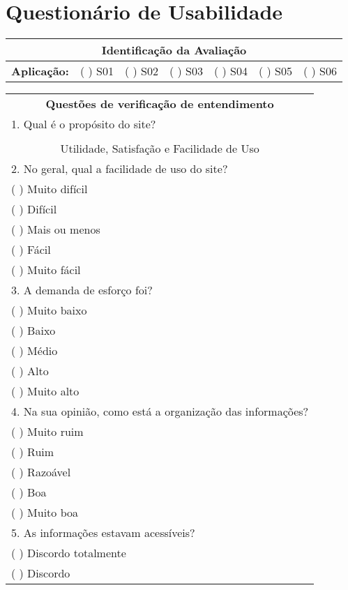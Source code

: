 \chapter{Questionário de Usabilidade}
\label{sec:questionariousabilidade}
\begin{tabular}{lllllll}
\hline
\multicolumn{7}{|c|}{\textbf{Identificação da Avaliação}} \\ 
\hline
\multicolumn{1}{|l|}{\textbf{Aplicação:}} & \multicolumn{1}{l|}{(   ) S01} & \multicolumn{1}{l|}{(   ) S02} & \multicolumn{1}{l|}{(   ) S03} & \multicolumn{1}{l|}{(   ) S04} & \multicolumn{1}{l|}{(   ) S05} & \multicolumn{1}{l|}{(   ) S06} \\ 
\hline
\end{tabular}

\begin{center}
\begin{longtable}{l}
\multicolumn{1}{c}{\textbf{Questões de verificação de entendimento}} \\ 
1. Qual é o propósito do site? \\ 
\hline
\multicolumn{1}{|l|}{} \\ 
\hline
\multicolumn{1}{c}{Utilidade, Satisfação e Facilidade de Uso} \\ 
2. No geral, qual a facilidade de uso do site?  \\ 
(  ) Muito difícil \\ 
(  ) Difícil \\ 
(  ) Mais ou menos \\ 
(  ) Fácil \\ 
(  ) Muito fácil \\ 
3. A demanda de esforço foi?  \\ 
(  ) Muito baixo \\ 
(  ) Baixo \\ 
(  ) Médio \\ 
(  ) Alto \\ 
(  ) Muito alto \\ 
4. Na sua opinião, como está a organização das informações?  \\ 
(  ) Muito ruim \\ 
(  ) Ruim \\ 
(  ) Razoável \\ 
(  ) Boa \\ 
(  ) Muito boa \\ 
5. As informações estavam acessíveis?  \\ 
(  ) Discordo totalmente \\ 
(  ) Discordo \\ 

\end{longtable}
\end{center}
